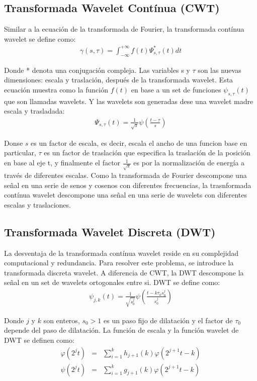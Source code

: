 \subsection{Transformada Wavelet Contínua (CWT)}
Similar a la ecuación de la transformada de Fourier, la transformada contínua
wavelet se define como:
\begin{eqnarray*}
	\gamma(s,\tau) = \int^{+\infty}_{-\infty}f(t)\Psi^{*}_{s,\tau}(t)dt
\end{eqnarray*}

Donde * denota una conjugación compleja. Las variables s y $\tau$ son las
nuevas dimensiones: escala y traslación, después de la transformada wavelet.
Esta ecuación muestra como la función $f(t)$ en base a un set de funciones
$\psi_{s,\tau}(t)$ que son llamadas wavelets. Y las wavelets son generadas dese
una wavelet madre escala y trasladada:
\begin{eqnarray*}
	\Psi_{s,\tau}(t) = \frac{1}{\sqrt{s}}\psi\left(\frac{t-\tau}{s}\right)
\end{eqnarray*}

Donse $s$ es un factor de escala, es decir, escala el ancho de una funcion base
en particular, $\tau$ es un factor de traslación que especifica la traslación
de la posición en base al eje t, y finalmente el factor $\frac{1}{\sqrt{s}}$ es
por la normalización de energía a través de diferentes escalas. Como la
transformada de Fourier descompone una señal en una serie de senos y cosenos
con diferentes frecuencias, la trasnformada contínua wavelet descompone una
señal en una serie de wavelets con diferentes escalas y traslaciones.

\subsection{Transformada Wavelet Discreta (DWT)}
La desventaja de la transformada contínua wavelet reside en su complejidad
computacional y redundancia. Para resolver este problema, se introduce la
transformada discreta wavelet. A diferencia de CWT, la DWT descompone la señal en un set de wavelets ortogonales entre si. DWT se define como:
\begin{eqnarray*}
	\psi_{j,k}(t) = \frac{1}{\sqrt{s^{j}_{0}}}\psi\left(\frac{t-k\tau_0s^{j}_{0}}{s^{j}_{0}}\right)
\end{eqnarray*}

Donde $j$ y $k$ son enteros, $s_0 > 1$ es un paso fijo de dilatación y el
factor de $\tau_0$ depende del paso de dilatación. La función de escala y la
función wavelet de DWT se definen como:
\begin{eqnarray*}
	\varphi(2^jt)	&=&	\sum^{k}_{i=1}h_{j+1}(k)\varphi(2^{j+1}t-k)\\
	\psi(2^jt)		&=&	\sum^{k}_{i=1}g_{j+1}(k)\varphi(2^{j+1}t-k)
\end{eqnarray*}

